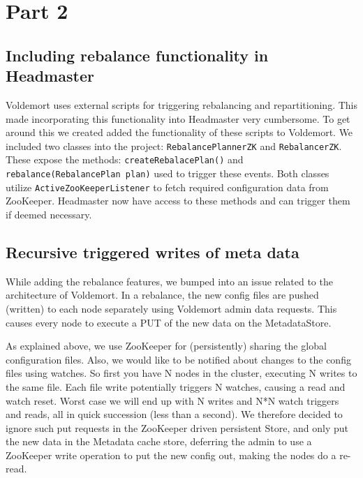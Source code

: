 \section{Part 2}

\subsection{Including rebalance functionality in Headmaster}
Voldemort uses external scripts for triggering rebalancing and repartitioning. This made incorporating this functionality into Headmaster very cumbersome. To get around this we created added the functionality of these scripts to Voldemort. We included two classes into the project: \texttt{RebalancePlannerZK} and \texttt{RebalancerZK}. These expose the methods: \texttt{createRebalacePlan()} and \texttt{rebalance(RebalancePlan plan)} used to trigger these events. Both classes utilize \texttt{ActiveZooKeeperListener} to fetch required configuration data from ZooKeeper. Headmaster now have access to these methods and can trigger them if deemed necessary. 

\subsection{Recursive triggered writes of meta data}
While adding the rebalance features, we bumped into an issue related to the architecture of Voldemort.
In a rebalance, the new config files are pushed (written) to each node separately using Voldemort admin data requests. This causes every node to execute a PUT of the new data on the MetadataStore.

As explained above, we use ZooKeeper for (persistently) sharing the global configuration files.
Also, we would like to be notified about changes to the config files using watches. So first you have N nodes in the cluster, executing N writes to the same file. Each file write potentially triggers N watches, causing a read and watch reset. Worst case we will end up with N writes and N*N watch triggers and reads, all in quick succession (less than a second).
We therefore decided to ignore such put requests in the ZooKeeper driven persistent Store, and only put the new data in the Metadata cache store, deferring the admin to use a ZooKeeper write operation to put the new config out, making the nodes do a re-read.


